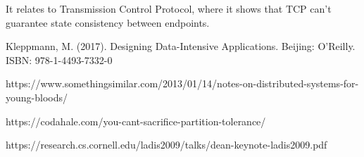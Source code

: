 \documentclass{article}
\begin{document}
    It relates to Transmission Control Protocol, where it shows that TCP can't guarantee state consistency between endpoints.

\begin{thebibliography}{}
Kleppmann, M. (2017). Designing Data-Intensive Applications. Beijing: O'Reilly. ISBN: 978-1-4493-7332-0

https://www.somethingsimilar.com/2013/01/14/notes-on-distributed-systems-for-young-bloods/

https://codahale.com/you-cant-sacrifice-partition-tolerance/


https://research.cs.cornell.edu/ladis2009/talks/dean-keynote-ladis2009.pdf

\end{thebibliography}
\end{document}
